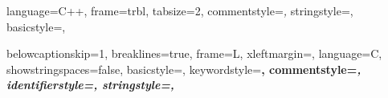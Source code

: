 {
  language=C++,
  frame=trbl,
  tabsize=2,
  commentstyle=\textit,
  stringstyle=\ttfamily, 
  basicstyle=\small,
}	

{
  belowcaptionskip=1\baselineskip,
  breaklines=true,
  frame=L,
  xleftmargin=\parindent,
  language=C,
  showstringspaces=false,
  basicstyle=\footnotesize\ttfamily,
  keywordstyle=\bfseries\color{green!40!black},
  commentstyle=\itshape\color{purple!40!black},
  identifierstyle=\color{blue},
  stringstyle=\color{orange},
}



\usepackage{sidecap}

\def\texis{\TeX \raise.15em\hbox{\textsc{i}}S}
% 
%     
%     
%     
\newenvironment{FraseCelebre}%
{\begin{list}{}{%
      \setlength{\leftmargin}{0.5\textwidth}%
      \setlength{\parsep}{0cm}%
      \addtolength{\topsep}{0.5cm}%
    }
  }
  {\unskip \end{list}}

